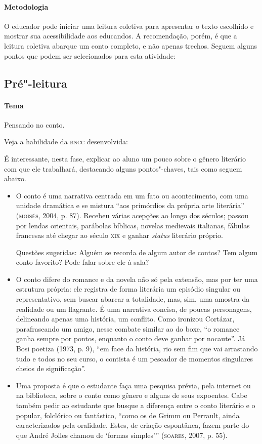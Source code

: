 \documentclass[11pt]{extarticle}
\begin{document}
\paragraph{Metodologia}
O educador pode iniciar uma leitura coletiva para apresentar o texto
escolhido e mostrar sua acessibilidade aos educandos. A recomendação,
porém, é que a leitura coletiva abarque um conto completo, e não apenas
trechos. Seguem alguns pontos que podem ser selecionados para esta
atividade:

\subsection{Pré"-leitura}

\paragraph{Tema} Pensando no conto.

Veja a habilidade da \textsc{bncc} desenvolvida:

É interessante, nesta fase, explicar ao aluno um pouco sobre o gênero
literário com que ele trabalhará, destacando alguns pontos"-chaves, tais
como seguem abaixo.

\begin{itemize}
\item O conto é uma narrativa centrada em um fato ou acontecimento, com uma
unidade dramática e se mistura ``aos primórdios da própria arte
literária'' (\textsc{moisés}, 2004, p. 87). Recebeu várias acepções ao longo dos
séculos; passou por lendas orientais, parábolas bíblicas, novelas
medievais italianas, fábulas francesas até chegar ao século \textsc{xix} e ganhar
\emph{status} literário próprio.

Questões sugeridas: Alguém se recorda de algum autor de contos? Tem
algum conto favorito? Pode falar sobre ele à sala?

\item O conto difere do romance e da novela não só pela extensão, mas por
ter uma estrutura própria: ele registra de forma literária um episódio
singular ou representativo, sem buscar abarcar a totalidade, mas, sim,
uma amostra da realidade ou um flagrante. É uma narrativa concisa, de
poucas personagens, delineando apenas uma história, um conflito. Como
ironizou Cortázar, parafraseando um amigo, nesse combate similar ao do
boxe, ``o romance ganha sempre por pontos, enquanto o conto deve ganhar
por nocaute''. Já Bosi poetiza (1973, p. 9), ``em face da história, rio
sem fim que vai arrastando tudo e todos no seu curso, o contista é um
pescador de momentos singulares cheios de significação''.

\item Uma proposta é que o estudante faça uma pesquisa prévia, pela internet 
ou na biblioteca, sobre o conto como gênero e alguns de seus expoentes.
Cabe também pedir ao estudante que busque a diferença entre o conto
literário e o popular, folclórico ou fantástico, ``como os de Grimm ou
Perrault, ainda caracterizados pela oralidade. Estes, de criação
espontânea, fazem parte do que André Jolles chamou de `formas
simples''' (\textsc{soares}, 2007, p. 55).
\end{itemize}
\end{document}
